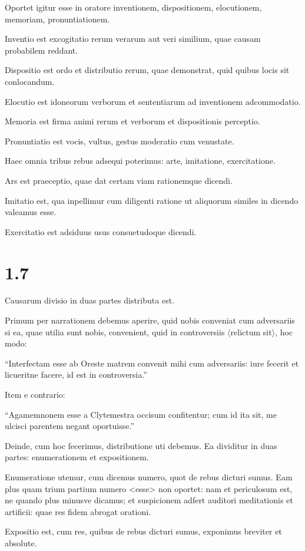 Oportet igitur esse in oratore inventionem, dispositionem, elocutionem, memoriam, pronuntiationem.

Inventio est excogitatio rerum verarum aut veri similium, quae causam probabilem reddant.

Dispositio est ordo et distributio rerum, quae demonstrat, quid quibus locis sit conlocandum.

Elocutio est idoneorum verborum et sententiarum ad inventionem adcommodatio.

Memoria est firma animi rerum et verborum et dispositionis perceptio.

Pronuntiatio est vocis, vultus, gestus moderatio cum venustate.

Haec omnia tribus rebus adsequi poterimus: arte, imitatione, exercitatione.

Ars est praeceptio, quae dat certam viam rationemque dicendi.

Imitatio est, qua inpellimur cum diligenti ratione ut aliquorum similes in dicendo valeamus esse.

Exercitatio est adsiduus usus consuetudoque dicendi.

\section*{1.7}

Causarum divisio in duas partes distributa est.

Primum per narrationem debemus aperire, quid nobis conveniat cum adversariis si ea, quae utilia sunt nobis, convenient, quid in controversiis $\langle$relictum sit$\rangle$, hoc modo:

``Interfectam esse ab Oreste matrem convenit mihi cum adversariis: iure fecerit et licueritne facere, id est in controversia.''

Item e contrario:

``Agamemnonem esse a Clytemestra occisum confitentur; cum id ita sit, me ulcisci parentem negant oportuisse.''

Deinde, cum hoc fecerimus, distributione uti debemus. Ea dividitur in duas partes: enumerationem et expositionem.

Enumeratione utemur, cum dicemus numero, quot de rebus dicturi sumus. Eam plus quam trium partium numero <esse> non oportet: nam et periculosum est, ne quando plus minusve dicamus; et suspicionem adfert auditori meditationis et artificii: quae res fidem abrogat orationi.

Expositio est, cum res, quibus de rebus dicturi sumus, exponimus breviter et absolute.

